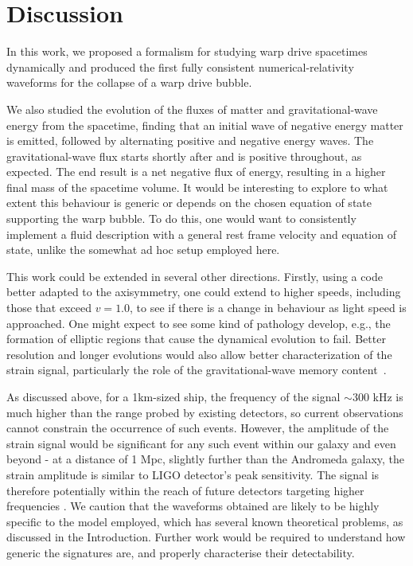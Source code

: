 \documentclass[twocolumn, numberedappendix, twocolappendix,apj, iop, a4paper]{openjournal}
\begin{document}
\section{Discussion}
\label{sec-discuss}

In this work, we proposed a formalism for studying warp drive spacetimes dynamically and produced the first fully consistent numerical-relativity waveforms for the collapse of a warp drive bubble. 

We also studied the evolution of the fluxes of matter and gravitational-wave energy from the spacetime, finding that an initial wave of negative energy matter is emitted, followed by alternating positive and negative energy waves. The gravitational-wave flux starts shortly after and is positive throughout, as expected. The end result is a net negative flux of energy, resulting in a higher final mass of the spacetime volume. It would be interesting to explore to what extent this behaviour is generic or depends on the chosen equation of state supporting the warp bubble. To do this, one would want to consistently implement a fluid description with a general rest frame velocity and equation of state, unlike the somewhat ad hoc setup employed here.

This work could be extended in several other directions. Firstly, using a code better adapted to the axisymmetry, one could extend to higher speeds, including those that exceed $v=1.0$, to see if there is a change in behaviour as light speed is approached. One might expect to see some kind of pathology develop, e.g., the formation of elliptic regions that cause the dynamical evolution to fail. Better resolution and longer evolutions would also allow better characterization of the strain signal, particularly the role of the gravitational-wave memory content~\citep{Mitman:2024uss}. 

As discussed above, for a 1km-sized ship, the frequency of the signal $\sim 300$ kHz is much higher than the range probed by existing detectors, so current observations cannot constrain the occurrence of such events. However, the amplitude of the strain signal would be significant for any such event within our galaxy and even beyond - at a distance of 1 Mpc, slightly further than the Andromeda galaxy, the strain amplitude is similar to LIGO detector's peak sensitivity. The signal is therefore potentially within the reach of future detectors targeting higher frequencies \citep{Aggarwal:2020olq}. We caution that the waveforms obtained are likely to be highly specific to the model employed, which has several known theoretical problems, as discussed in the Introduction. Further work would be required to understand how generic the signatures are, and properly characterise their detectability.
\end{document}

